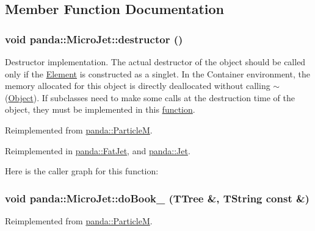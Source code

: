 \subsection{Member Function Documentation}
\hypertarget{classpanda_1_1MicroJet_a89f2dbacfc1c34c4f34185ea305f8797}{
\subsubsection[{destructor}]{\setlength{\rightskip}{0pt plus 5cm}void panda::MicroJet::destructor ()}}
\label{classpanda_1_1MicroJet_a89f2dbacfc1c34c4f34185ea305f8797}


Destructor implementation. The actual destructor of the object should be called only if the \hyperlink{classpanda_1_1Element}{Element} is constructed as a singlet. In the Container environment, the memory allocated for this object is directly deallocated without calling $\sim$(\hyperlink{classpanda_1_1Object}{Object}). If subclasses need to make some calls at the destruction time of the object, they must be implemented in this \hyperlink{namespacepanda_1_1function}{function}. 

Reimplemented from \hyperlink{classpanda_1_1ParticleM_abef15d28e6e33ee92c0b318bd41af2ca}{panda::ParticleM}.

Reimplemented in \hyperlink{classpanda_1_1FatJet_a421049d4b4315facb5bda39746f1a38b}{panda::FatJet}, and \hyperlink{classpanda_1_1Jet_adbd430a93e346588348e1eebaa90c42a}{panda::Jet}.

Here is the caller graph for this function:\hypertarget{classpanda_1_1MicroJet_aa1f5281c41c34033e5ef194f9d846413}{
\subsubsection[{doBook\_\-}]{\setlength{\rightskip}{0pt plus 5cm}void panda::MicroJet::doBook\_\- (TTree \&, \/  TString const \&)}}
\label{classpanda_1_1MicroJet_aa1f5281c41c34033e5ef194f9d846413}


Reimplemented from \hyperlink{classpanda_1_1ParticleM_a55d6e7e91edbc88e980a0031c299ef18}{panda::ParticleM}.

